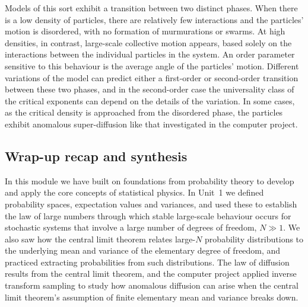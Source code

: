 Models of this sort exhibit a transition between two distinct phases.
When there is a low density of particles, there are relatively few interactions and the particles' motion is disordered, with no formation of murmurations or swarms.
At high densities, in contrast, large-scale collective motion appears, based solely on the interactions between the individual particles in the system.
An order parameter sensitive to this behaviour is the average angle of the particles' motion.
Different variations of the model can predict either a first-order or second-order transition between these two phases, and in the second-order case the universality class of the critical exponents can depend on the details of the variation. %
In some cases, as the critical density is approached from the disordered phase, the particles exhibit anomalous super-diffusion like that investigated in the computer project. %



\subsection{Wrap-up recap and synthesis}
In this module we have built on foundations from probability theory to develop and apply the core concepts of statistical physics.
In Unit~1 we defined probability spaces, expectation values and variances, and used these to establish the law of large numbers through which stable large-scale behaviour occurs for stochastic systems that involve a large number of degrees of freedom, $N \gg 1$.
We also saw how the central limit theorem relates large-$N$ probability distributions to the underlying mean and variance of the elementary degree of freedom, and practiced extracting probabilities from such distributions.
The law of diffusion results from the central limit theorem, and the computer project applied inverse transform sampling to study how anomalous diffusion can arise when the central limit theorem's assumption of finite elementary mean and variance breaks down.

